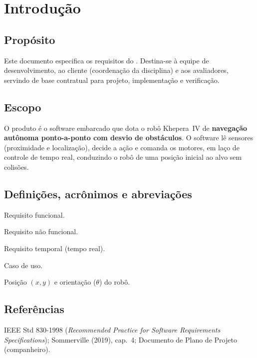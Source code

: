 
\newcommand{\tipodoc}{Análise de Requisitos}
\newcommand{\datadoc}{16 de junho de 2026}


\fazcapa
\controleversoes
\tableofcontents
\newpage

\section{Introdução}
\subsection{Propósito}
Este documento especifica os requisitos do \emph{\projnome}. Destina-se à equipe de desenvolvimento, ao cliente (coordenação da disciplina) e aos avaliadores, servindo de base contratual para projeto, implementação e verificação.

\subsection{Escopo}
O produto é o software embarcado que dota o robô Khepera~IV de \textbf{navegação autônoma ponto-a-ponto com desvio de obstáculos}. O software lê sensores (proximidade e localização), decide a ação e comanda os motores, em laço de controle de tempo real, conduzindo o robô de uma posição inicial ao alvo sem colisões.

\subsection{Definições, acrônimos e abreviações}
\begin{description}[style=nextline,leftmargin=1.2cm,font=\ttfamily]
  \item[RF] Requisito funcional.
  \item[RNF] Requisito não funcional.
  \item[RT] Requisito temporal (tempo real).
  \item[UC] Caso de uso.
  \item[Pose] Posição $(x,y)$ e orientação ($\theta$) do robô.
\end{description}

\subsection{Referências}
IEEE Std 830-1998 (\emph{Recommended Practice for Software Requirements Specifications}); Sommerville (2019), cap.~4; Documento de Plano de Projeto (companheiro).


